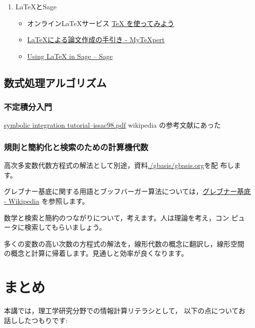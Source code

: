 \documentclass[dvipdfmx,11pat]{jarticle}
\begin{document}
\begin{enumerate}
\item \LaTeX{}とSage
\label{sec:org886851c}

\begin{itemize}
\item オンライン\LaTeX{}サービス  \href{https://oku.edu.mie-u.ac.jp/\~okumura/texonweb/}{\TeX{} を使ってみよう}

\item \href{https://mytexpert.osdn.jp/index.php?LaTeX\%A4\%CB\%A4\%E8\%A4\%EB\%CF\%C0\%CA\%B8\%BA\%EE\%C0\%AE\%A4\%CE\%BC\%EA\%B0\%FA\%A4\%AD}{\LaTeX{}による論文作成の手引き - MyTeXpert}

\item \href{http://sage.math.gordon.edu/home/pub/51/}{Using \LaTeX{} in Sage -- Sage}
\end{itemize}
\end{enumerate}

\subsection{数式処理アルゴリズム}
\label{sec:orgeb14482}

\subsubsection{不定積分入門}
\label{sec:org537d994}
\href{http://www-sop.inria.fr/cafe/Manuel.Bronstein/publications/issac98.pdf}{symbolic integration tutorial--issac98.pdf}
wikipedia の参考文献にあった

\subsubsection{規則と簡約化と検索のための計算機代数}
\label{sec:org69094e8}

高次多変数代数方程式の解法として別途，資料\url{./gbasis/gbasis.org}を配
布します。

グレブナー基底に関する用語とブッフバーガー算法については，\href{https://ja.wikipedia.org/wiki/\%E3\%82\%B0\%E3\%83\%AC\%E3\%83\%96\%E3\%83\%8A\%E3\%83\%BC\%E5\%9F\%BA\%E5\%BA\%95}{グレブナー基底 - Wikipedia} 
を参照します。

数学と検索と簡約のつながりについて，考えます。人は理論を考え，コン
ピュータに検索してもらいましょう。

多くの変数の高い次数の方程式の解法を，線形代数の概念に翻訳し，線形空間
の概念と計算に帰着します。見通しと効率が良くなります。


\section{まとめ}
\label{sec:orge7d6845}
本講では，理工学研究分野での情報計算リテラシとして，
以下の点についてお話ししたつもりです:
\end{document}
